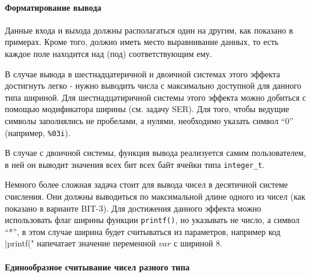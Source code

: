 \paragraph{Форматирование вывода}
Данные входа и выхода должны располагаться один на другим, как показано в примерах. Кроме того, должно иметь место выравнивание данных, то есть каждое поле находится над (под) соответствующим ему. 

В случае вывода в шестнадцатеричной и двоичной системах этого эффекта достигнуть легко - нужно выводить числа с максимально доступной для данного типа шириной. Для шестнадцатиричной системы этого эффекта можно добиться с помощью модификатора ширины (см. задачу SER). Для того, чтобы ведущие символы заполнялись не пробелами, а нулями, необходимо указать символ ``0'' (например, \verb|%03i|).

В случае с двоичной системы, функция вывода реализуется самим пользователем, в ней он выводит значения всех бит всех байт ячейки типа \texttt{integer\_t}.

Немного более сложная задача стоит для вывода чисел в десятичной системе счисления. Они должны выводиться по максимальной длине одного из чисел (как показано в варианте BIT-3). Для достижения данного эффекта можно использовать флаг ширины функции \texttt{printf()}, но указывать не число, а символ ``*'', в этом случае ширина будет считываться из параметров, например код \zzmintinline|printf("%
напечатает значение переменной $var$ с шириной 8.
\begin{comment}
\begin{itemize}
    \item Здесь гораздо подробнее надо остановиться на \texttt{integer\_t}, как его нужно универсально использовать, пользуясь sizeof и прочими средствами. 
    
    \item Объяснить про считывание с клавиатуры, про тип MaxInt. Рассмотреть приведение типов, а то они не понимают ничерта в этом, тупят ужасно.
    \item Показать на наглядном примерчике с картинкой в памяти как выставить бит, например, или как выставить байт в числе. Как "склеить" числа.
    \item Кроме того, научить их выводить числа в правильном формате. Нужно ли объяснять про двоичную что-то?
\end{itemize}
\end{comment}
\paragraph{Единообразное считывание чисел разного типа}

